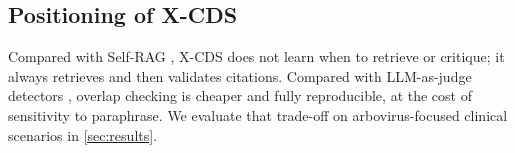 \subsection{Positioning of X-CDS}
Compared with Self-RAG \citep{asai2024selfrag}, X-CDS does not learn when to retrieve or critique; it always retrieves and then validates citations. Compared with LLM-as-judge detectors \citep{manakul2023selfcheckgpt}, overlap checking is cheaper and fully reproducible, at the cost of sensitivity to paraphrase. We evaluate that trade-off on arbovirus-focused clinical scenarios in \cref{sec:results}.
